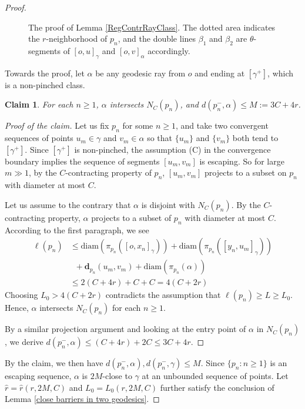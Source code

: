 \documentclass[10pt,a4paper]{amsart}
\newtheorem{claim}{Claim}
\newcommand{\proj}{\textbf{d}}
\begin{document}
\begin{proof}
\begin{figure}
\begin{tikzpicture}[x=0.75pt,y=0.75pt,yscale=-1,xscale=1]
\end{tikzpicture}
    \caption{The proof of Lemma \ref{RegContrRayClass}. The dotted area indicates the $r$-neighborhood of $p_n$, and the double lines $\beta_1$ and $\beta_2$ are $\theta$-segments of $[o,u]_\gamma$ and $[o,v]_\alpha$ accordingly.}
    \label{fig:placeholder}
\end{figure} 
Towards the proof, let $\alpha$ be any geodesic ray from $o$ and ending at $[\gamma^+]$, which is a non-pinched class. %
\begin{claim}
For each $n\ge 1$, $\alpha$ intersects $N_{C}(p_n)$, and $d(p_n^-,\alpha)\le  M:=3C+4r$. 
\end{claim}
\begin{proof}[Proof of the claim]
Let us fix $p_n$ for some $n\ge 1$, and take  two convergent sequences of points  $u_m\in \gamma$ and $v_m\in \alpha$ so that $\{u_m\}$ and $\{v_m\}$ both tend to  $[\gamma^+]$. Since $[\gamma^+]$ is non-pinched,   the assumption (C) in the convergence boundary implies the sequence of segments $[u_m,v_m]$ is escaping. So for large $m\gg 1$, by the $C$-contracting property of $p_n$, $[u_m,v_m]$ projects to a subset on $p_n$ with diameter at most $C$. 

Let us assume to the contrary that $\alpha$ is disjoint with $N_{C}(p_n)$. By the $C$-contracting property, $\alpha$   projects to a subset of $p_n$ with diameter at most $C$.   According to the first paragraph, we see $$
\begin{aligned}
\ell(p_n) &\le \mathrm{diam}(\pi_{p_n}([o,x_n]_\gamma))+\mathrm{diam}(\pi_{p_n}([y_n,u_m]_\gamma))\\
&\;\;+\proj_{p_n}(u_m,v_m)+\mathrm{diam}(\pi_{p_n}(\alpha))  \\
&\le 2(C+4r)+C+C=4(C+2r)    
\end{aligned}$$  Choosing $L_0>4(C+2r)$  contradicts the assumption that $\ell(p_n)\ge L\ge L_0$. Hence, $\alpha$ intersects $N_{C}(p_n)$ for each $n\ge 1$. 

By a similar projection argument and  looking at the entry point of $\alpha$ in $N_{C}(p_n)$, we  derive $d(p_n^-,\alpha)\le (C+4r)+ 2C\le 3C+4r$.    
\end{proof}
By the claim, we then have $d(p_n^-,\alpha),d(p_n^-,\gamma)\le M$. Since $\{p_n:n\ge 1\}$ is an {escaping} sequence, $\alpha$ is $2M$-close to  $\gamma$ at an unbounded sequence of points. Let $\hat r=\hat r(r,2M,C)$  and $L_0=L_0(r,2M,C)$ further  satisfy the conclusion of Lemma \ref{close barriers in two geodesics}.  %


\end{proof}
\end{document}
